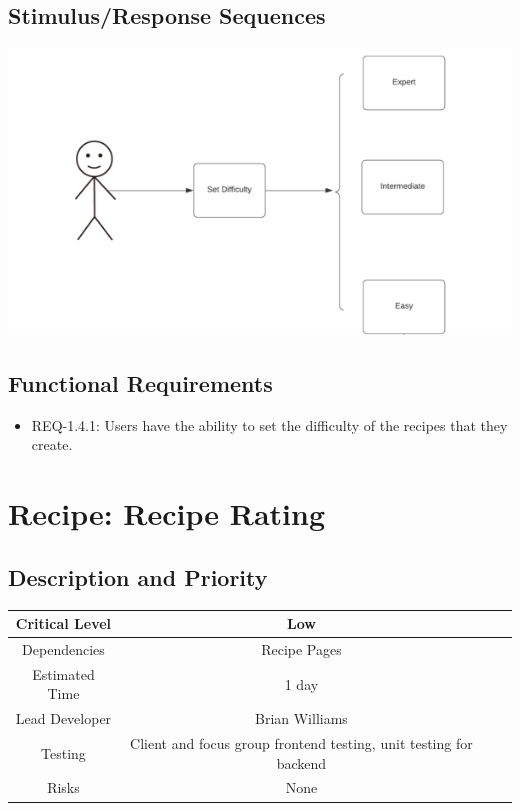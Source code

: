 \documentclass{scrreprt}
\begin{document}
\subsection{Stimulus/Response Sequences}

\includegraphics{FlowCharts/Recipe-Difficulty.png}

\subsection{Functional Requirements}

\begin{itemize}
    \item REQ-1.4.1: Users have the ability to set the difficulty of the recipes that they create.
\end{itemize}

\section{Recipe: Recipe Rating}

\subsection{Description and Priority}
\begin{center}
    \begin{tabular}{| c | c | c | c |}
        \hline
        Critical Level & Low \\
        \hline
        Dependencies & Recipe Pages \\
        \hline
        Estimated Time & 1 day \\
        \hline
        Lead Developer & Brian Williams \\
        \hline
        Testing & Client and focus group frontend testing, unit testing for backend \\
        \hline
        Risks & None \\
        \hline
    \end{tabular}
\end{center}
\end{document}
